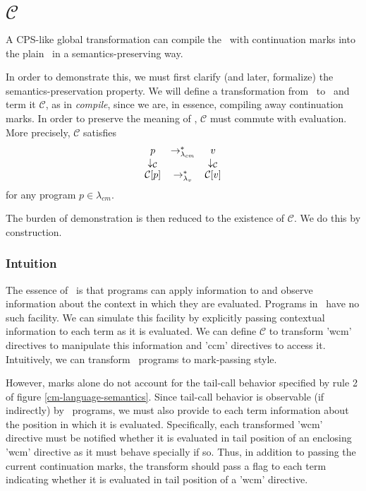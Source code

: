 \chapter{$\mathcal{C}$}

A CPS-like global transformation can compile the \lc\ with continuation marks into
the plain \lc\ in a semantics-preserving way.

In order to demonstrate this, we must first clarify (and later, formalize) the semantics-preservation property. We will define a transformation from \cm\ to \lv\ and term it $\mathcal{C}$, as in \emph{compile}, since we are, in essence, compiling away continuation marks. In order to preserve the meaning of \cm, $\mathcal{C}$ must commute with evaluation. More precisely, $\mathcal{C}$ satisfies
\[
\begin{array}{ccc}
p & \rightarrow_{\lambda_{cm}}^{*} & v\\
\downarrow_\mathcal{C} & & \downarrow_\mathcal{C}\\
\mathcal{C}[p] & \rightarrow_{\lambda_v}^{*} & \mathcal{C}[v]
\end{array}
\]
for any program $p\in\lambda_{cm}$.

The burden of demonstration is then reduced to the existence of $\mathcal{C}$. We do this by construction.

\subsection{Intuition}

The essence of \cm\ is that programs can apply information to and observe information about the context in which they are evaluated. Programs in \lv\ have no such facility. We can simulate this facility by explicitly passing contextual information to each term as it is evaluated. We can define $\mathcal{C}$ to transform \scheme'wcm' directives to manipulate this information and \scheme'ccm' directives to access it. Intuitively, we can transform \cm\ programs to mark-passing style.

However, marks alone do not account for the tail-call behavior specified by rule 2 of figure \ref{cm-language-semantics}. Since tail-call behavior is observable (if indirectly) by \cm\ programs, we must also provide to each term information about the position in which it is evaluated. Specifically, each transformed \scheme'wcm' directive must be notified whether it is evaluated in tail position of an enclosing \scheme'wcm' directive as it must behave specially if so. Thus, in addition to passing the current continuation marks, the transform should pass a flag to each term indicating whether it is evaluated in tail position of a \scheme'wcm' directive.

